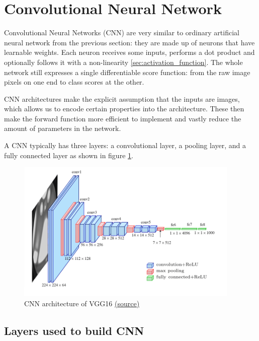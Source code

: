 \newpage




\section{Convolutional Neural Network}
\label{Convolutional Neural Network}
Convolutional Neural Networks (CNN) are very similar to ordinary artificial neural network from the previous section: they are made up of neurons that have learnable weights. Each neuron receives some inputs, performs a dot product and optionally follows it with a non-linearity \ref{sec:activation_function}. The whole network still expresses a single differentiable score function: from the raw image pixels on one end to class scores at the other. 

CNN architectures make the explicit assumption that the inputs are images, which allows us to encode certain properties into the architecture. These then make the forward function more efficient to implement and vastly reduce the amount of parameters in the network.

A CNN typically has three layers: a convolutional layer, a pooling layer, and a fully connected layer as shown in figure \ref{fig:cnn_1}.


\begin{figure}[h]
    \centering
    \includegraphics[width=0.95\textwidth]{images/cnn_1.png}
    \caption{CNN architecture of VGG16 \href{https://www.researchgate.net/figure/Fig-A1-The-standard-VGG-16-network-architecture-as-proposed-in-32-Note-that-only_fig3_322512435}{(\underline{source})}}
    \label{fig:cnn_1}
\end{figure}

\subsection{Layers used to build CNN}

